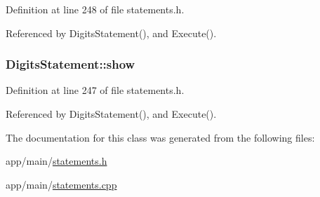 Definition at line 248 of file statements.\+h.



Referenced by Digits\+Statement(), and Execute().

\subsubsection[{\texorpdfstring{show}{show}}]{ Digits\+Statement\+::show\hspace{0.3cm}{\ttfamily [private]}}\hypertarget{classDigitsStatement_ae069e8baf410c17d2b2b60c143daabb5}{}\label{classDigitsStatement_ae069e8baf410c17d2b2b60c143daabb5}


Definition at line 247 of file statements.\+h.



Referenced by Digits\+Statement(), and Execute().



The documentation for this class was generated from the following files\+:\begin{DoxyCompactItemize}
\item 
app/main/\hyperlink{statements_8h}{statements.\+h}\item 
app/main/\hyperlink{statements_8cpp}{statements.\+cpp}\end{DoxyCompactItemize}
